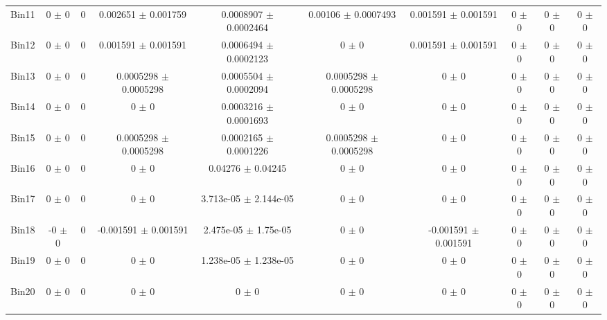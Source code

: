 \begin{tabular}{@{\extracolsep{4pt}}lccccccccc@{}}
     Bin11 & 0 $\pm$ 0 & 0 & 0.002651 $\pm$ 0.001759 & 0.0008907 $\pm$ 0.0002464 & 0.00106 $\pm$ 0.0007493 & 0.001591 $\pm$ 0.001591 & 0 $\pm$ 0 & 0 $\pm$ 0 & 0 $\pm$ 0 \\ 
     Bin12 & 0 $\pm$ 0 & 0 & 0.001591 $\pm$ 0.001591 & 0.0006494 $\pm$ 0.0002123 & 0 $\pm$ 0 & 0.001591 $\pm$ 0.001591 & 0 $\pm$ 0 & 0 $\pm$ 0 & 0 $\pm$ 0 \\ 
     Bin13 & 0 $\pm$ 0 & 0 & 0.0005298 $\pm$ 0.0005298 & 0.0005504 $\pm$ 0.0002094 & 0.0005298 $\pm$ 0.0005298 & 0 $\pm$ 0 & 0 $\pm$ 0 & 0 $\pm$ 0 & 0 $\pm$ 0 \\ 
     Bin14 & 0 $\pm$ 0 & 0 & 0 $\pm$ 0 & 0.0003216 $\pm$ 0.0001693 & 0 $\pm$ 0 & 0 $\pm$ 0 & 0 $\pm$ 0 & 0 $\pm$ 0 & 0 $\pm$ 0 \\ 
     Bin15 & 0 $\pm$ 0 & 0 & 0.0005298 $\pm$ 0.0005298 & 0.0002165 $\pm$ 0.0001226 & 0.0005298 $\pm$ 0.0005298 & 0 $\pm$ 0 & 0 $\pm$ 0 & 0 $\pm$ 0 & 0 $\pm$ 0 \\ 
     Bin16 & 0 $\pm$ 0 & 0 & 0 $\pm$ 0 & 0.04276 $\pm$ 0.04245 & 0 $\pm$ 0 & 0 $\pm$ 0 & 0 $\pm$ 0 & 0 $\pm$ 0 & 0 $\pm$ 0 \\ 
     Bin17 & 0 $\pm$ 0 & 0 & 0 $\pm$ 0 & 3.713e-05 $\pm$ 2.144e-05 & 0 $\pm$ 0 & 0 $\pm$ 0 & 0 $\pm$ 0 & 0 $\pm$ 0 & 0 $\pm$ 0 \\ 
     Bin18 & -0 $\pm$ 0 & 0 & -0.001591 $\pm$ 0.001591 & 2.475e-05 $\pm$ 1.75e-05 & 0 $\pm$ 0 & -0.001591 $\pm$ 0.001591 & 0 $\pm$ 0 & 0 $\pm$ 0 & 0 $\pm$ 0 \\ 
     Bin19 & 0 $\pm$ 0 & 0 & 0 $\pm$ 0 & 1.238e-05 $\pm$ 1.238e-05 & 0 $\pm$ 0 & 0 $\pm$ 0 & 0 $\pm$ 0 & 0 $\pm$ 0 & 0 $\pm$ 0 \\ 
     Bin20 & 0 $\pm$ 0 & 0 & 0 $\pm$ 0 & 0 $\pm$ 0 & 0 $\pm$ 0 & 0 $\pm$ 0 & 0 $\pm$ 0 & 0 $\pm$ 0 & 0 $\pm$ 0 \\ 
\hline\hline
  \end{tabular}
